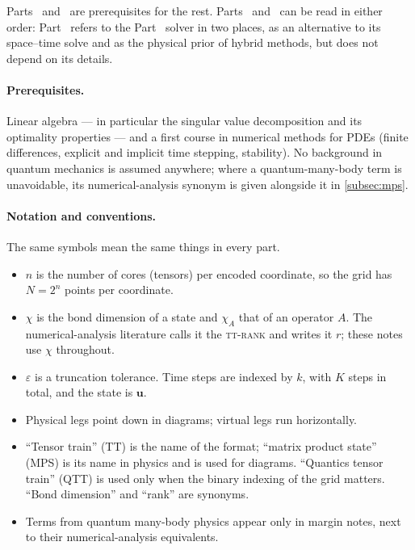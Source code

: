 \documentclass[english,course]{lecturenotes}
\begin{document}
Parts~ and~ are prerequisites for the rest.
Parts~ and~ can be read in either order: Part~
refers to the Part~ solver in two places, as an alternative to its
space--time solve and as the physical prior of hybrid methods, but does not
depend on its details.

\paragraph{Prerequisites.}
Linear algebra --- in particular the singular value decomposition and its
optimality properties --- and a first course in numerical methods for PDEs
(finite differences, explicit and implicit time stepping, stability). No
background in quantum mechanics is assumed anywhere; where a quantum-many-body
term is unavoidable, its numerical-analysis synonym is given alongside it in
\cref{subsec:mps}.

\paragraph{Notation and conventions.}
The same symbols mean the same things in every part.
\begin{itemize}
  \item $n$ is the number of cores (tensors) per encoded coordinate, so the grid
    has $N = 2^n$ points per coordinate.
  \item $\chi$ is the bond dimension of a state and $\chi_A$ that of an operator
    $A$. The numerical-analysis literature calls it the \textsc{tt-rank} and
    writes it $r$; these notes use $\chi$ throughout.
  \item $\varepsilon$ is a truncation tolerance. Time steps are indexed by $k$,
    with $K$ steps in total, and the state is $\mathbf u$.
  \item Physical legs point down in diagrams; virtual legs run horizontally.
  \item \enquote{Tensor train} (TT) is the name of the format; \enquote{matrix
    product state} (MPS) is its name in physics and is used for diagrams.
    \enquote{Quantics tensor train} (QTT) is used only when the binary
    indexing of the grid matters. \enquote{Bond dimension} and \enquote{rank}
    are synonyms.
  \item Terms from quantum many-body physics appear only in margin notes, next
    to their numerical-analysis equivalents.
\end{itemize}
\end{document}
